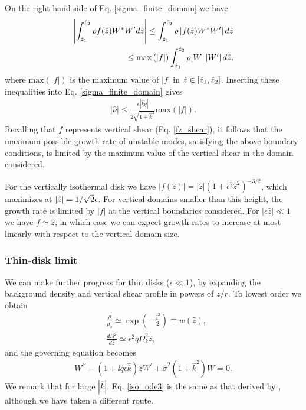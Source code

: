 On the right hand side of Eq. \ref{sigma_finite_domain} we have
\begin{align}
  \left|\int_{\hat{z}_1}^{\hat{z}_2}\rho
    f(\hat{z}) W^*W^\prime d\hat{z}\right|\leq \int_{\hat{z}_1}^{\hat{z}_2}\rho
  \left|f(\hat{z})W^*W^\prime \right|d\hat{z} \notag\\
  \leq
  \mathrm{max}\left(|f|\right)\int_{\hat{z}_1}^{\hat{z}_2}\rho
  |W|\left|W^\prime \right|d\hat{z},
\end{align}
where $\mathrm{max}(|f|)$ is the maximum value of $|f|$ in
$\hat{z}\in[\hat{z}_1,\hat{z}_2]$. Inserting these inequalities into
Eq. \ref{sigma_finite_domain} gives
\begin{align}\label{max_growth}
  |\hat{\nu}|\leq
  \frac{\epsilon |\hat{k} q|}{2\sqrt{1+\hat{k}^2}}\mathrm{max}(|f|). 
\end{align}
Recalling that $f$ represents vertical shear (Eq. \ref{fz_shear}), it
follows that the maximum possible growth rate of unstable modes,
satisfying the above boundary conditions, is limited by the maximum
value of the vertical shear in the domain considered. 

For the vertically isothermal disk we have $|f(\hat{z})| =
|\hat{z}|\left(1+\epsilon^2\hat{z}^2\right)^{-3/2}$, which maximizes
at $|\hat{z}|=1/\sqrt{2}\epsilon$. For vertical domains smaller 
than this height, the growth rate is limited by $|f|$ at the vertical
boundaries considered. For $|\epsilon\hat{z}|\ll1$ we have $f\simeq
\hat{z}$, in which case we can expect growth rates to increase at most linearly
with respect to the vertical domain size.   %



\subsubsection{Thin-disk limit}
We can make further progress for thin disks ($\epsilon\ll1$), 
by expanding the background density and vertical shear profile in powers
of $z/r$. To lowest order we obtain 
\begin{align}
  &\frac{\rho}{\rho_0} \simeq 
  \exp{\left(-\frac{\hat{z}^2}{2}\right)} \equiv w(\hat{z}),\label{thin_dens}\\
  &\frac{d\Omega^2}{d\hat{z}} \simeq \epsilon^2q\Omega_k^2\hat{z}, \label{thin_vshear}
\end{align} 
and the governing equation becomes 
\begin{align}\label{iso_ode3}
  W^{\prime\prime} - \left(1 + \ii q\epsilon
    \hat{k}\right)\hat{z}W^\prime  +
  \hat{\sigma}^2\left(1+\hat{k}^2\right)W = 
  0.
\end{align}
We remark that for large $|\hat{k}|$, Eq. \ref{iso_ode3} is the same as
that derived by \cite{nelson13}, although we have taken a different
route.  

